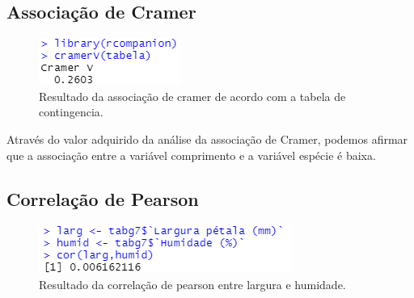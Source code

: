 \documentclass{article}
\begin{document}
\paragraph{}

\subsection{Associação de Cramer}

\begin{figure}[h]
       \centering %
        \includegraphics[scale=0.8]{associacao_de_cramer_entre_compriemento_e_especie.png} 
       \caption{Resultado da associação de cramer de acordo com  a tabela de contingencia.}
       \label{fig:logo}
    \end{figure}

Através do valor adquirido da análise da associação de Cramer, podemos afirmar que a associação entre a variável comprimento e a variável espécie é baixa.

\paragraph{}
\paragraph{}
\paragraph{}
\paragraph{}
\paragraph{}
\paragraph{}

\subsection{Correlação de Pearson}

\begin{figure}[h]
       \centering %
        \includegraphics[scale=0.8]{correlacao_de_pearson_entre_largura_e_humidade.png} 
       \caption{Resultado da correlação de pearson entre largura e humidade.}
       \label{fig:logo}
    \end{figure}
\end{document}
